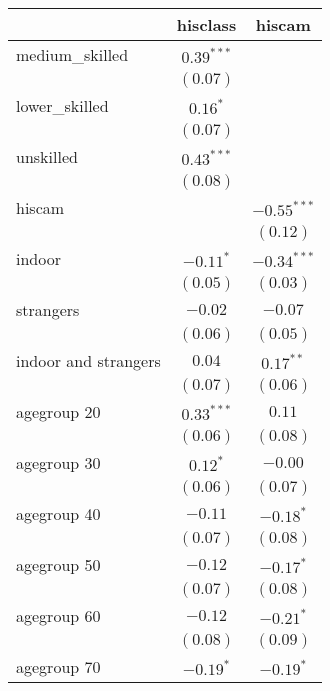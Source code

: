 
\begin{table}
\begin{center}
\begin{tabular}{l c c}
\hline
 & hisclass & hiscam \\
\hline
medium\_skilled      & $0.39^{***}$  &               \\
                     & $(0.07)$      &               \\
lower\_skilled       & $0.16^{*}$    &               \\
                     & $(0.07)$      &               \\
unskilled            & $0.43^{***}$  &               \\
                     & $(0.08)$      &               \\
hiscam               &               & $-0.55^{***}$ \\
                     &               & $(0.12)$      \\
indoor               & $-0.11^{*}$   & $-0.34^{***}$ \\
                     & $(0.05)$      & $(0.03)$      \\
strangers            & $-0.02$       & $-0.07$       \\
                     & $(0.06)$      & $(0.05)$      \\
indoor and strangers & $0.04$        & $0.17^{**}$   \\
                     & $(0.07)$      & $(0.06)$      \\
agegroup 20          & $0.33^{***}$  & $0.11$        \\
                     & $(0.06)$      & $(0.08)$      \\
agegroup 30          & $0.12^{*}$    & $-0.00$       \\
                     & $(0.06)$      & $(0.07)$      \\
agegroup 40          & $-0.11$       & $-0.18^{*}$   \\
                     & $(0.07)$      & $(0.08)$      \\
agegroup 50          & $-0.12$       & $-0.17^{*}$   \\
                     & $(0.07)$      & $(0.08)$      \\
agegroup 60          & $-0.12$       & $-0.21^{*}$   \\
                     & $(0.08)$      & $(0.09)$      \\
agegroup 70          & $-0.19^{*}$   & $-0.19^{*}$   \\

\end{tabular}
\end{center}
\end{table}
